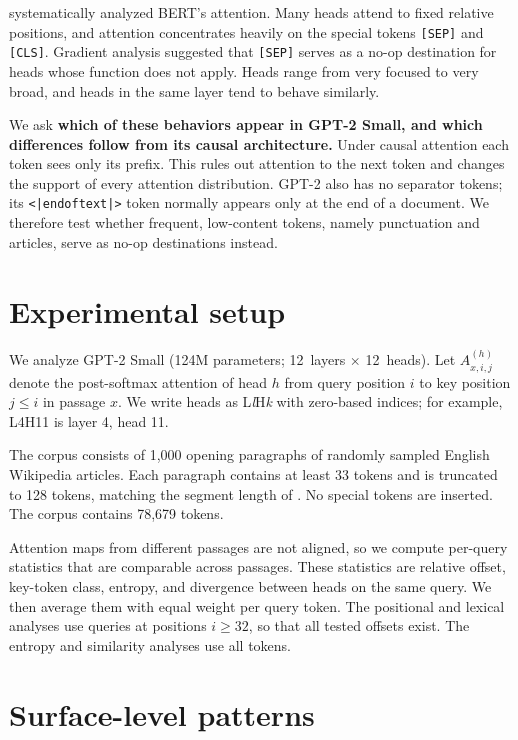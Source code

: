 \documentclass{article}
\newcommand{\SEP}{\texttt{[SEP]}}
\newcommand{\CLS}{\texttt{[CLS]}}
\newcommand{\eot}{\texttt{<|endoftext|>}}
\begin{document}
\citet{clark2019} systematically analyzed BERT's attention. Many heads attend to fixed relative positions, and attention concentrates heavily on the special tokens \SEP{} and \CLS{}. Gradient analysis suggested that \SEP{} serves as a no-op destination for heads whose function does not apply. Heads range from very focused to very broad, and heads in the same layer tend to behave similarly.

We ask \textbf{which of these behaviors appear in GPT-2 Small, and which differences follow from its causal architecture.} Under causal attention each token sees only its prefix. This rules out attention to the next token and changes the support of every attention distribution. GPT-2 also has no separator tokens; its \eot{} token normally appears only at the end of a document. We therefore test whether frequent, low-content tokens, namely punctuation and articles, serve as no-op destinations instead.

\section{Experimental setup}
\label{sec:setup}

We analyze GPT-2 Small (124M parameters; 12~layers $\times$ 12~heads). Let $A^{(h)}_{x,i,j}$ denote the post-softmax attention of head $h$ from query position $i$ to key position $j\leq i$ in passage $x$. We write heads as L\textit{l}H\textit{k} with zero-based indices; for example, L4H11 is layer 4, head 11.

The corpus consists of 1,000 opening paragraphs of randomly sampled English Wikipedia articles. Each paragraph contains at least 33 tokens and is truncated to 128 tokens, matching the segment length of \citet{clark2019}. No special tokens are inserted. The corpus contains 78,679 tokens.

Attention maps from different passages are not aligned, so we compute per-query statistics that are comparable across passages. These statistics are relative offset, key-token class, entropy, and divergence between heads on the same query. We then average them with equal weight per query token. The positional and lexical analyses use queries at positions $i\geq32$, so that all tested offsets exist. The entropy and similarity analyses use all tokens.

\section{Surface-level patterns}
\label{sec:surface}
\end{document}
